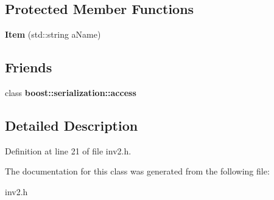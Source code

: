 \subsection*{Protected Member Functions}
\begin{DoxyCompactItemize}
\item 
\hypertarget{class_item_a98956a129a5a3c47ac8466306090df0c}{}\label{class_item_a98956a129a5a3c47ac8466306090df0c} 
{\bfseries Item} (std\+::string a\+Name)
\end{DoxyCompactItemize}
\subsection*{Friends}
\begin{DoxyCompactItemize}
\item 
\hypertarget{class_item_ac98d07dd8f7b70e16ccb9a01abf56b9c}{}\label{class_item_ac98d07dd8f7b70e16ccb9a01abf56b9c} 
class {\bfseries boost\+::serialization\+::access}
\end{DoxyCompactItemize}


\subsection{Detailed Description}


Definition at line 21 of file inv2.\+h.



The documentation for this class was generated from the following file\+:\begin{DoxyCompactItemize}
\item 
inv2.\+h\end{DoxyCompactItemize}
